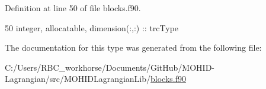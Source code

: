 Definition at line 50 of file blocks.\+f90.


\begin{DoxyCode}
50         \textcolor{keywordtype}{integer}, \textcolor{keywordtype}{allocatable}, \textcolor{keywordtype}{dimension(:,:)} :: trcType
\end{DoxyCode}


The documentation for this type was generated from the following file\+:\begin{DoxyCompactItemize}
\item 
C\+:/\+Users/\+R\+B\+C\+\_\+workhorse/\+Documents/\+Git\+Hub/\+M\+O\+H\+I\+D-\/\+Lagrangian/src/\+M\+O\+H\+I\+D\+Lagrangian\+Lib/\mbox{\hyperlink{blocks_8f90}{blocks.\+f90}}\end{DoxyCompactItemize}
